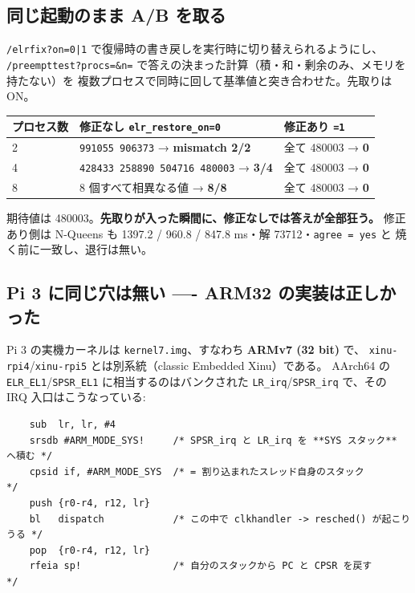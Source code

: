 \documentclass[a4paper,11pt]{ltjsarticle}
\begin{document}
\subsection{同じ起動のまま A/B を取る}
\texttt{/elrfix?on=0|1} で復帰時の書き戻しを実行時に切り替えられるようにし、
\texttt{/preempttest?procs=\&n=} で答えの決まった計算（積・和・剰余のみ、メモリを持たない）を
複数プロセスで同時に回して基準値と突き合わせた。先取りは ON。

\begin{center}
\begin{tabular}{lll}
\toprule
プロセス数 & 修正なし \texttt{elr\_restore\_on=0} & 修正あり \texttt{=1} \\
\midrule
2 & \texttt{991055 906373} → \textbf{mismatch 2/2} & 全て 480003 → \textbf{0} \\
4 & \texttt{428433 258890 504716 480003} → \textbf{3/4} & 全て 480003 → \textbf{0} \\
8 & 8 個すべて相異なる値 → \textbf{8/8} & 全て 480003 → \textbf{0} \\
\bottomrule
\end{tabular}
\end{center}

\noindent
期待値は 480003。\textbf{先取りが入った瞬間に、修正なしでは答えが全部狂う。}
修正あり側は N-Queens も 1397.2 / 960.8 / 847.8 ms・解 73712・\texttt{agree = yes} と
焼く前に一致し、退行は無い。

\subsection{Pi 3 に同じ穴は無い ---- ARM32 の実装は正しかった}
Pi 3 の実機カーネルは \texttt{kernel7.img}、すなわち \textbf{ARMv7 (32 bit)} で、
\texttt{xinu-rpi4}/\texttt{xinu-rpi5} とは別系統（classic Embedded Xinu）である。
AArch64 の \texttt{ELR\_EL1}/\texttt{SPSR\_EL1} に相当するのはバンクされた
\texttt{LR\_irq}/\texttt{SPSR\_irq} で、その IRQ 入口はこうなっている:

\begin{lstlisting}
    sub  lr, lr, #4
    srsdb #ARM_MODE_SYS!     /* SPSR_irq と LR_irq を **SYS スタック** へ積む */
    cpsid if, #ARM_MODE_SYS  /* = 割り込まれたスレッド自身のスタック          */
    push {r0-r4, r12, lr}
    bl   dispatch            /* この中で clkhandler -> resched() が起こりうる */
    pop  {r0-r4, r12, lr}
    rfeia sp!                /* 自分のスタックから PC と CPSR を戻す          */
\end{lstlisting}
\end{document}
